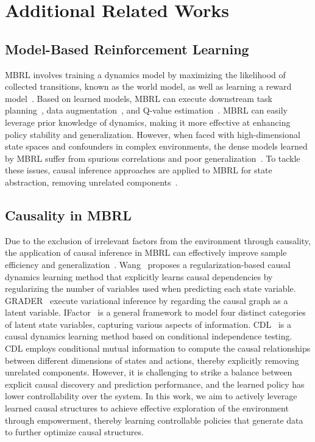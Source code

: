 \section{Additional Related Works}
\label{Additional Related Works}
\subsection{Model-Based Reinforcement Learning}
MBRL involves training a dynamics model by maximizing the likelihood of collected transitions, known as the world model, as well as learning a reward model~\citep{moerland2023model,janner2019trust}. Based on learned models, MBRL can execute downstream task planning~\citep{nguyen2021temporal, zhao2021consciousness}, data augmentation~\citep{pitis2022mocoda, okada2021dreaming, yu2020mopo}, and Q-value estimation~\citep{wang2022sample,amos2021model}. MBRL can easily leverage prior knowledge of dynamics, making it more effective at enhancing policy stability and generalization. 
However, when faced with high-dimensional state spaces and confounders in complex environments, the dense models learned by MBRL suffer from spurious correlations and poor generalization~\citep{wang2022causal,bharadhwaj2022information}. To tackle these issues, causal inference approaches are applied to MBRL for state abstraction, removing unrelated components~\citep{hwang2023quantized,ding2022generalizing,wang2024building}. 

\subsection{Causality in MBRL}
Due to the exclusion of irrelevant factors from the environment through causality, the application of causal inference in MBRL can effectively improve sample efficiency and generalization~\citep{ke2021systematic,mutti2023provably,liu2024learning,urpicausal}. Wang~\citep{wang2021task} proposes a regularization-based causal dynamics learning method that explicitly learns causal dependencies by regularizing the number of variables used when predicting each state variable. 
GRADER~\citep{ding2022generalizing} execute variational inference by regarding the causal graph as a latent variable. IFactor~\citep{liu2024learning} is a general framework to model four distinct categories of latent state variables, capturing various aspects of information. CDL~\citep{wang2022causal} is a causal dynamics learning method based on conditional independence testing. CDL employs conditional mutual information to compute the causal relationships between different dimensions of states and actions, thereby explicitly removing unrelated components. However, it is challenging to strike a balance between explicit causal discovery and prediction performance, and the learned policy has lower controllability over the system. In this work, we aim to actively leverage learned causal structures to achieve effective exploration of the environment through empowerment, thereby learning controllable policies that generate data to further optimize causal structures. 

